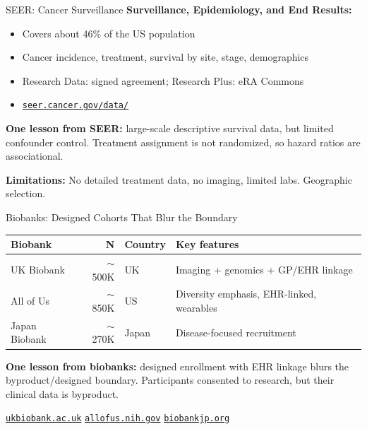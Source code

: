 \documentclass[aspectratio=169,10pt]{beamer}
\begin{document}
\begin{frame}{SEER: Cancer Surveillance}
\textbf{Surveillance, Epidemiology, and End Results:}
\begin{itemize}
    \item Covers about 46\% of the US population
    \item Cancer incidence, treatment, survival by site, stage, demographics
    \item Research Data: signed agreement; Research Plus: eRA Commons
    \item \href{https://seer.cancer.gov/data/}{\texttt{\small seer.cancer.gov/data/}}
\end{itemize}

\vspace{0.2em}
\pause
\textbf{One lesson from SEER:} large-scale descriptive survival data, but limited confounder control. Treatment assignment is not randomized, so hazard ratios are associational.

\vspace{0.1em}
\textbf{Limitations:} No detailed treatment data, no imaging, limited labs. Geographic selection.
\end{frame}

\begin{frame}{Biobanks: Designed Cohorts That Blur the Boundary}
\begin{center}
{\small
\renewcommand{\arraystretch}{1.15}
\begin{tabular}{p{2.2cm}rp{2cm}p{4.8cm}}
\toprule
\textbf{Biobank} & \textbf{N} & \textbf{Country} & \textbf{Key features} \\
\midrule
UK Biobank & $\sim$500K & UK & Imaging + genomics + GP/EHR linkage \\
All of Us & $\sim$850K & US & Diversity emphasis, EHR-linked, wearables \\
Japan Biobank & $\sim$270K & Japan & Disease-focused recruitment \\
\bottomrule
\end{tabular}
}
\end{center}

\vspace{0.1em}
\textbf{One lesson from biobanks:} designed enrollment with EHR linkage blurs the byproduct/designed boundary. Participants consented to research, but their clinical data is byproduct.

\vspace{0.1em}
\pause
{\small \href{https://ukbiobank.ac.uk}{\texttt{ukbiobank.ac.uk}} \quad \href{https://allofus.nih.gov}{\texttt{allofus.nih.gov}} \quad \href{https://biobankjp.org}{\texttt{biobankjp.org}}}
\end{frame}
\end{document}
